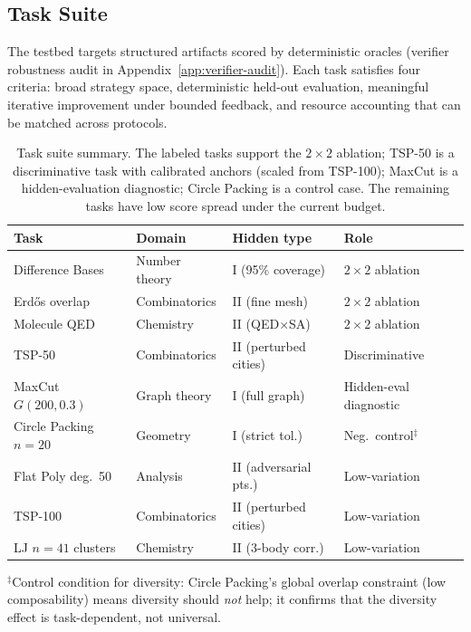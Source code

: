 \documentclass{article}
\begin{document}
\subsection{Task Suite}
\label{sec:task-suite}

The testbed targets structured artifacts scored by deterministic oracles (verifier robustness audit in Appendix~\ref{app:verifier-audit}). Each task satisfies four criteria: broad strategy space, deterministic held-out evaluation, meaningful iterative improvement under bounded feedback, and resource accounting that can be matched across protocols.

\begin{table}[t]
\caption{Task suite summary. The labeled tasks support the $2{\times}2$ ablation; TSP-50 is a discriminative task with calibrated anchors (scaled from TSP-100); MaxCut is a hidden-evaluation diagnostic; Circle Packing is a control case. The remaining tasks have low score spread under the current budget.}
\label{tab:coretracks}
\centering
\small
\begin{tabular}{l l l l}
\toprule
Task & Domain & Hidden type & Role \\
\midrule
Difference Bases & Number theory & I (95\% coverage) & $2{\times}2$ ablation \\
Erd\H{o}s overlap & Combinatorics & II (fine mesh) & $2{\times}2$ ablation \\
Molecule QED & Chemistry & II (QED$\times$SA) & $2{\times}2$ ablation \\
TSP-50 & Combinatorics & II (perturbed cities) & Discriminative \\
MaxCut $G(200,0.3)$ & Graph theory & I (full graph) & Hidden-eval diagnostic \\
Circle Packing $n{=}20$ & Geometry & I (strict tol.) & Neg.\ control$^\ddagger$ \\
Flat Poly deg.~50 & Analysis & II (adversarial pts.) & Low-variation \\
TSP-100 & Combinatorics & II (perturbed cities) & Low-variation \\
LJ $n{=}41$ clusters & Chemistry & II (3-body corr.) & Low-variation \\
\bottomrule
\end{tabular}

\smallskip\noindent\small $^\ddagger$Control condition for diversity: Circle Packing's global overlap constraint (low composability) means diversity should \emph{not} help; it confirms that the diversity effect is task-dependent, not universal.
\end{table}
\end{document}
